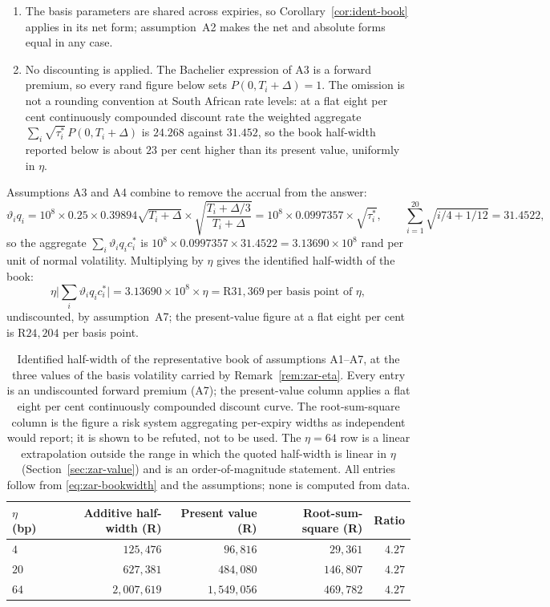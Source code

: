\documentclass[../../../main.tex]{subfiles}
\begin{document}
\begin{enumerate}[nosep,label=\textbf{A\arabic*.},leftmargin=2.2\parindent]
\item The basis parameters are shared across expiries, so Corollary~\ref{cor:ident-book} applies in its net form; assumption~A2 makes the net and absolute forms equal in any case.
\item No discounting is applied. The Bachelier expression of A3 is a forward premium, so every rand figure below sets $P(0,T_i+\Delta)=1$. The omission is not a rounding convention at South African rate levels: at a flat eight per cent continuously compounded discount rate the weighted aggregate $\sum_i\sqrt{\tau^*_i}\,P(0,T_i+\Delta)$ is $24.268$ against $31.452$, so the book half-width reported below is about $23$ per cent higher than its present value, uniformly in $\eta$.
\end{enumerate}

Assumptions A3 and A4 combine to remove the accrual from the answer:
\[
\vartheta_iq_i=10^8\times0.25\times0.39894\sqrt{T_i+\Delta}\times\sqrt{\frac{T_i+\Delta/3}{T_i+\Delta}}
=10^8\times0.0997357\times\sqrt{\tau^*_i} ,
\qquad
\sum_{i=1}^{20}\sqrt{i/4+1/12}=31.4522 ,
\]
so the aggregate $\sum_i\vartheta_iq_ic^*_i$ is $10^8\times0.0997357\times31.4522=3.13690\times10^8$ rand per unit of normal volatility. Multiplying by $\eta$ gives the identified half-width of the book:
\begin{equation}\label{eq:zar-bookwidth}
\eta\Big|\sum_i\vartheta_iq_ic^*_i\Big|=3.13690\times10^8\times\eta
=\text{R}31{,}369\ \text{per basis point of }\eta ,
\end{equation}
undiscounted, by assumption~A7; the present-value figure at a flat eight per cent is R$24{,}204$ per basis point.

\begin{table}[htbp]\centering\small
\caption{Identified half-width of the representative book of assumptions A1--A7, at the three values of the basis volatility carried by Remark~\ref{rem:zar-eta}. Every entry is an undiscounted forward premium (A7); the present-value column applies a flat eight per cent continuously compounded discount curve. The root-sum-square column is the figure a risk system aggregating per-expiry widths as independent would report; it is shown to be refuted, not to be used. The $\eta=64$ row is a linear extrapolation outside the range in which the quoted half-width is linear in $\eta$ (Section~\ref{sec:zar-value}) and is an order-of-magnitude statement. All entries follow from \eqref{eq:zar-bookwidth} and the assumptions; none is computed from data.}\label{tab:zar-book}
\begin{tabular}{@{}lrrrr@{}}
\toprule
$\eta$ (bp) & Additive half-width (R) & Present value (R) & Root-sum-square (R) & Ratio \\
\midrule
$4$  & $125{,}476$   & $96{,}816$  & $29{,}361$  & $4.27$ \\
$20$ & $627{,}381$   & $484{,}080$ & $146{,}807$ & $4.27$ \\
$64$ & $2{,}007{,}619$ & $1{,}549{,}056$ & $469{,}782$ & $4.27$ \\
\bottomrule
\end{tabular}
\end{table}
\end{document}
